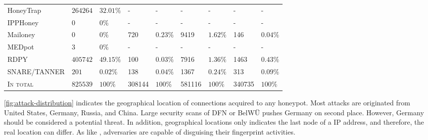 \begin{table}
\begin{tabularx}{\linewidth}{l|XX|XX|XX|XX}
        HoneyTrap \cite{honeytrap2021}            & $264264$                               & $32.01\%$                                & -                                & -                                  & -               & -             & -               & -             \\
        IPPHoney \cite{ipphoney2021}              & $0$                                    & $0\%$                                    & -                                & -                                  & -               & -             & -               & -             \\
        Mailoney \cite{mailoney2021}              & $0$                                    & $0\%$                                    & 720                              & $0.23\%$                           & 9419            & $1.62\%$      & 146             & $0.04\%$      \\
        MEDpot \cite{medpot2021}                  & $3$                                    & $0\%$                                    & -                                & -                                  & -               & -             & -               & -             \\
        RDPY \cite{rdpy2021}                      & $405742$                               & $49.15\%$                                & 100                              & $0.03\%$                           & 7916            & $1.36\%$      & 1463            & $0.43\%$      \\
        SNARE/TANNER \cite{snare2021}             & $201$                                  & $0.02\%$                                 & 138                              & $0.04\%$                           & 1367            & $0.24\%$      & 313             & $0.09\%$      \\
        \hline
        \textsc{In total}                         & $825539$                               & $100\%$                                  & 308144                           & $100\%$                            & 581116          & $100\%$       & 340735          & $100\%$       \\
        \bottomrule
    \end{tabularx}
    \label{tab:overview-honeypots-attacks}
\end{table}

\autoref{fig:attack-distribution} indicates the geographical location of connections acquired to any honeypot.
Most attacks are originated from United States, Germany, Russia, and China.
Large security scans of DFN or BelWÜ pushes Germany on second place.
However, Germany should be considered a potential threat.
In addition, geographical locations only indicates the last node of a IP address, and therefore, the real location can differ.
As like \citet{Kelly2021}, adversaries are capable of disguising their fingerprint activities.

